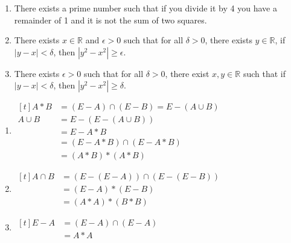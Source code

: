 \documentclass{article}
\begin{document}
\maketitle

\begin{enumerate}
\item There exists a prime number such that if you divide it by 4 you have a remainder of 1 and it is not the sum of two squares.

\item There exists $x \in \mathbb{R}$ and $\epsilon > 0$ such that for all $\delta > 0$, there exists $y \in \mathbb{R}$, if $|y - x| < \delta$, then $|y^2 - x^2| \geq \epsilon$.

\item There exists $\epsilon > 0$ such that for all $\delta > 0$, there exist $x, y \in \mathbb{R}$ such that if $|y - x| < \delta$, then $|y^2 - x^2| \geq \delta$.
\end{enumerate}

\begin{enumerate}
\item
$\begin{aligned}[t]
A * B    &= (E - A) \cap (E - B) = E - (A \cup B) \\
A \cup B &= E - (E - (A \cup B)) \\
         &= E - A * B \\
         &= (E - A * B) \cap (E - A * B) \\
         &= (A * B) * (A * B)
\end{aligned}$

\item
$\begin{aligned}[t]
A \cap B &= (E - (E - A)) \cap (E - (E - B)) \\
         &= (E - A) * (E - B) \\
         &= (A * A) * (B * B)
\end{aligned}$

\item
$\begin{aligned}[t]
E - A &= (E - A) \cap (E-A) \\
      &= A * A
\end{aligned}$
\end{enumerate}
\end{document}
